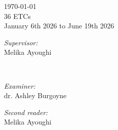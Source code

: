 \documentclass[12pt]{report}
\begin{document}
\begin{titlepage}





{\Large \today}\\[1cm] %



36 ETCs\\ %

January 6th 2026 to June 19th 2026 \\[1cm]%






\begin{minipage}[t]{0.4\textwidth}

\begin{flushleft} \large

\emph{Supervisor:} \\

Melika Ayoughi%

\end{flushleft}

\end{minipage}

~

\begin{minipage}[t]{0.4\textwidth}

\begin{flushright} \large

\emph{Examiner:} \\

dr. Ashley Burgoyne \\

\vspace{0.5cm}

\emph{Second reader:} \\

Melika Ayoughi\\

\end{flushright}


\end{minipage}
\end{titlepage}
\end{document}
